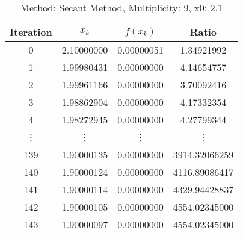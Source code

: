 \begin{table}
\centering
\caption{Method: Secant Method, Multiplicity: 9, x0: 2.1}
\label{tab:table_Secant_Method_9_2_1}
\begin{tabular}{c c c c}
\toprule
Iteration &      $x_k$ &   $f(x_k)$ &         Ratio \\
\midrule
        0 & 2.10000000 & 0.00000051 &    1.34921992 \\
        1 & 1.99980431 & 0.00000000 &    4.14654757 \\
        2 & 1.99961166 & 0.00000000 &    3.70092416 \\
        3 & 1.98862904 & 0.00000000 &    4.17332354 \\
        4 & 1.98272945 & 0.00000000 &    4.27799344 \\
   \vdots &     \vdots &     \vdots &        \vdots \\
      139 & 1.90000135 & 0.00000000 & 3914.32066259 \\
      140 & 1.90000124 & 0.00000000 & 4116.89086417 \\
      141 & 1.90000114 & 0.00000000 & 4329.94428837 \\
      142 & 1.90000105 & 0.00000000 & 4554.02345000 \\
      143 & 1.90000097 & 0.00000000 & 4554.02345000 \\
\bottomrule
\end{tabular}
\end{table}
